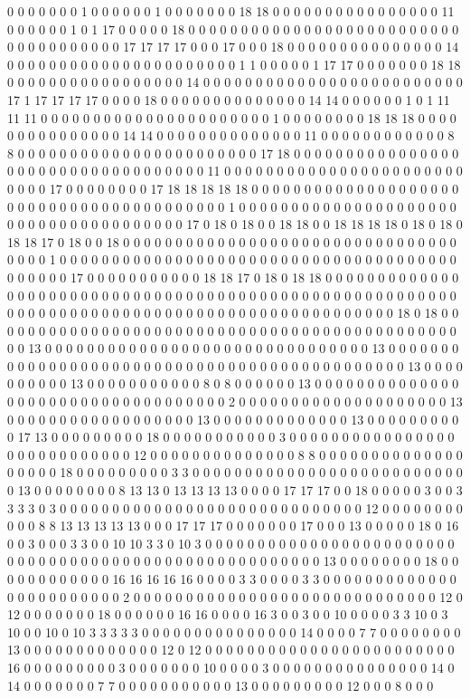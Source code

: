 0 0 0 0 0 0 0 1 0 0 0 0 0 0 1 0 0 0 0 0 0 0 18 18 0 0 0 0 0 0 0 0 0 0 0 0 0 0 0 0 11 0 0 0 0 0 0 1 0 1 17 0 0 0 0 0 18 0 0 0 0 0 0 0 0 0 0 0 0 0 0 0 0 0 0 0 0 0 0 0 0 0 0 0 0 0 0 0 0 0 0 0 0 0 17 17 17 17 0 0 0 17 0 0 0 18 0 0 0 0 0 0 0 0 0 0 0 0 0 0 0 14 0 0 0 0 0 0 0 0 0 0 0 0 0 0 0 0 0 0 0 0 0 0 1 1 0 0 0 0 0 1 17 17 0 0 0 0 0 0 0 18 18 0 0 0 0 0 0 0 0 0 0 0 0 0 0 0 0 0 14 0 0 0 0 0 0 0 0 0 0 0 0 0 0 0 0 0 0 0 0 0 0 0 0 0 17 1 17 17 17 17 0 0 0 0 18 0 0 0 0 0 0 0 0 0 0 0 0 0 0 14 14 0 0 0 0 0 0 1 0 1 11 11 11 0 0 0 0 0 0 0 0 0 0 0 0 0 0 0 0 0 0 0 0 0 0 1 0 0 0 0 0 0 0 0 18 18 18 0 0 0 0 0 0 0 0 0 0 0 0 0 0 0 14 14 0 0 0 0 0 0 0 0 0 0 0 0 0 0 11 0 0 0 0 0 0 0 0 0 0 0 0 8 8 0 0 0 0 0 0 0 0 0 0 0 0 0 0 0 0 0 0 0 0 0 0 0 17 18 0 0 0 0 0 0 0 0 0 0 0 0 0 0 0 0 0 0 0 0 0 0 0 0 0 0 0 0 0 0 0 0 0 0 0 11 0 0 0 0 0 0 0 0 0 0 0 0 0 0 0 0 0 0 0 0 0 0 0 0 0 0 0 17 0 0 0 0 0 0 0 0 17 18 18 18 18 18 0 0 0 0 0 0 0 0 0 0 0 0 0 0 0 0 0 0 0 0 0 0 0 0 0 0 0 0 0 0 0 0 0 0 0 0 0 0 0 0 0 1 0 0 0 0 0 0 0 0 0 0 0 0 0 0 0 0 0 0 0 0 0 0 0 0 0 0 0 0 0 0 0 0 0 0 0 0 0 0 17 0 18 0 18 0 0 18 18 0 0 18 18 18 18 0 18 0 18 0 18 18 17 0 18 0 0 18 0 0 0 0 0 0 0 0 0 0 0 0 0 0 0 0 0 0 0 0 0 0 0 0 0 0 0 0 0 0 0 0 0 0 0 0 1 0 0 0 0 0 0 0 0 0 0 0 0 0 0 0 0 0 0 0 0 0 0 0 0 0 0 0 0 0 0 0 0 0 0 0 0 0 0 0 0 0 0 0 0 17 0 0 0 0 0 0 0 0 0 0 0 18 18 17 0 18 0 18 18 0 0 0 0 0 0 0 0 0 0 0 0 0 0 0 0 0 0 0 0 0 0 0 0 0 0 0 0 0 0 0 0 0 0 0 0 0 0 0 0 0 0 0 0 0 0 0 0 0 0 0 0 0 0 0 0 0 0 0 0 0 0 0 0 0 0 0 0 0 0 0 0 0 0 0 0 0 0 0 0 0 0 0 0 0 0 0 0 0 0 0 0 0 18 0 18 0 0 0 0 0 0 0 0 0 0 0 0 0 0 0 0 0 0 0 0 0 0 0 0 0 0 0 0 0 0 0 0 0 0 0 0 0 0 0 0 0 0 0 0 0 0 0 13 0 0 0 0 0 0 0 0 0 0 0 0 0 0 0 0 0 0 0 0 0 0 0 0 0 0 0 0 0 0 0 13 0 0 0 0 0 0 0 0 0 0 0 0 0 0 0 0 0 0 0 0 0 0 0 0 0 0 0 0 0 0 0 0 0 0 0 0 0 0 0 0 0 0 0 0 0 13 0 0 0 0 0 0 0 0 0 0 13 0 0 0 0 0 0 0 0 0 0 0 8 0 8 0 0 0 0 0 0 13 0 0 0 0 0 0 0 0 0 0 0 0 0 0 0 0 0 0 0 0 0 0 0 0 0 0 0 0 0 0 0 0 0 0 0 2 0 0 0 0 0 0 0 0 0 0 0 0 0 0 0 0 0 0 0 0 13 0 0 0 0 0 0 0 0 0 0 0 0 0 0 0 0 0 0 13 0 0 0 0 0 0 0 0 0 0 0 0 0 13 0 0 0 0 0 0 0 0 0 0 17 13 0 0 0 0 0 0 0 0 0 18 0 0 0 0 0 0 0 0 0 0 0 3 0 0 0 0 0 0 0 0 0 0 0 0 0 0 0 0 0 0 0 0 0 0 0 0 0 0 0 0 12 0 0 0 0 0 0 0 0 0 0 0 0 0 0 8 8 0 0 0 0 0 0 0 0 0 0 0 0 0 0 0 0 0 0 0 18 0 0 0 0 0 0 0 0 0 3 3 0 0 0 0 0 0 0 0 0 0 0 0 0 0 0 0 0 0 0 0 0 0 0 0 0 0 0 13 0 0 0 0 0 0 0 0 8 13 13 0 13 13 13 13 0 0 0 0 17 17 17 0 0 18 0 0 0 0 0 3 0 0 3 3 3 3 0 3 0 0 0 0 0 0 0 0 0 0 0 0 0 0 0 0 0 0 0 0 0 0 0 0 0 0 0 0 0 12 0 0 0 0 0 0 0 0 0 0 0 8 8 13 13 13 13 13 0 0 0 17 17 17 0 0 0 0 0 0 0 17 0 0 0 13 0 0 0 0 0 18 0 16 0 0 3 0 0 0 3 3 0 0 10 10 3 3 0 10 3 0 0 0 0 0 0 0 0 0 0 0 0 0 0 0 0 0 0 0 0 0 0 0 0 0 0 0 0 0 0 0 0 0 0 0 0 0 0 0 0 0 0 0 0 0 0 0 0 0 0 0 0 0 0 13 0 0 0 0 0 0 0 0 18 0 0 0 0 0 0 0 0 0 0 0 0 16 16 16 16 16 0 0 0 0 3 3 0 0 0 0 3 3 0 0 0 0 0 0 0 0 0 0 0 0 0 0 0 0 0 0 0 0 0 0 0 0 2 0 0 0 0 0 0 0 0 0 0 0 0 0 0 0 0 0 0 0 0 0 0 0 0 0 0 0 0 0 12 0 12 0 0 0 0 0 0 0 18 0 0 0 0 0 0 16 16 0 0 0 0 16 3 0 0 3 0 0 10 0 0 0 0 3 3 10 0 3 10 0 0 10 0 10 3 3 3 3 3 0 0 0 0 0 0 0 0 0 0 0 0 0 0 0 14 0 0 0 0 7 7 0 0 0 0 0 0 0 0 13 0 0 0 0 0 0 0 0 0 0 0 0 0 12 0 12 0 0 0 0 0 0 0 0 0 0 0 0 0 0 0 0 0 0 0 0 0 0 0 0 16 0 0 0 0 0 0 0 0 0 3 0 0 0 0 0 0 0 10 0 0 0 0 3 0 0 0 0 0 0 0 0 0 0 0 0 0 0 0 14 0 14 0 0 0 0 0 0 0 7 7 0 0 0 0 0 0 0 0 0 0 0 13 0 0 0 0 0 0 0 0 0 12 0 0 0 8 0 0 0 